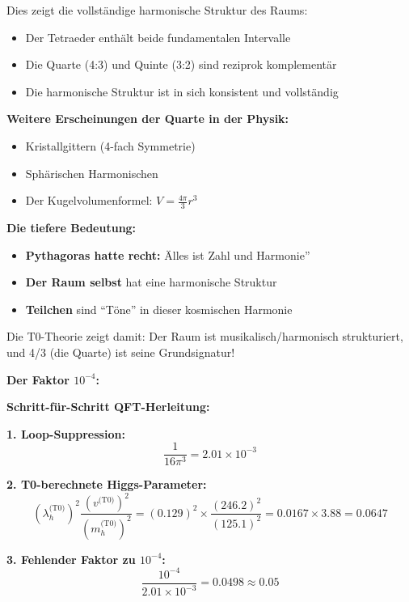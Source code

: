 Dies zeigt die vollständige harmonische Struktur des Raums:
\begin{itemize}
	\item Der Tetraeder enthält beide fundamentalen Intervalle
	\item Die Quarte (4:3) und Quinte (3:2) sind reziprok komplementär
	\item Die harmonische Struktur ist in sich konsistent und vollständig
\end{itemize}

\textbf{Weitere Erscheinungen der Quarte in der Physik:}
\begin{itemize}
	\item Kristallgittern (4-fach Symmetrie)
	\item Sphärischen Harmonischen
	\item Der Kugelvolumenformel: $V = \frac{4\pi}{3}r^3$
\end{itemize}

\textbf{Die tiefere Bedeutung:}
\begin{itemize}
	\item \textbf{Pythagoras hatte recht:} Älles ist Zahl und Harmonie''
	\item \textbf{Der Raum selbst} hat eine harmonische Struktur
	\item \textbf{Teilchen} sind ``Töne'' in dieser kosmischen Harmonie
\end{itemize}

Die T0-Theorie zeigt damit: Der Raum ist musikalisch/harmonisch strukturiert, und 4/3 (die Quarte) ist seine Grundsignatur!

\textbf{Der Faktor $10^{-4}$:}

\textbf{Schritt-für-Schritt QFT-Herleitung:}

\textbf{1. Loop-Suppression:}
\begin{equation}
	\frac{1}{16\pi^3} = 2.01 \times 10^{-3}
\end{equation}

\textbf{2. T0-berechnete Higgs-Parameter:}
\begin{equation}
	(\lambda_h^{\text{(T0)}})^2 \frac{(v^{\text{(T0)}})^2}{(m_h^{\text{(T0)}})^2} = (0.129)^2 \times \frac{(246.2)^2}{(125.1)^2} = 0.0167 \times 3.88 = 0.0647
\end{equation}

\textbf{3. Fehlender Faktor zu $10^{-4}$:}
\begin{equation}
	\frac{10^{-4}}{2.01 \times 10^{-3}} = 0.0498 \approx 0.05
\end{equation}

